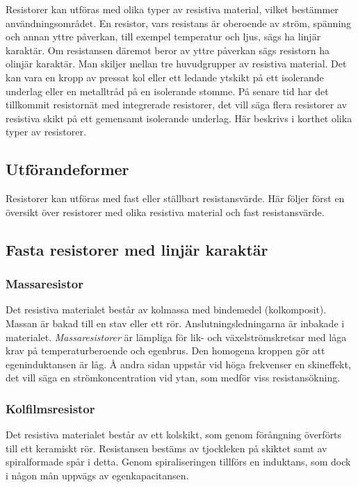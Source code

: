 Resistorer kan utföras med olika typer av resistiva material, vilket bestämmer
användningsområdet.
En resistor, vars resistans är oberoende av ström, spänning och annan yttre
påverkan, till exempel temperatur och ljus, sägs ha linjär karaktär.
Om resistansen däremot beror av yttre påverkan sägs resistorn ha olinjär
karaktär.
Man skiljer mellan tre huvudgrupper av resistiva material.
Det kan vara en kropp av pressat kol eller ett ledande ytskikt på ett isolerande
underlag eller en metalltråd på en isolerande stomme.
På senare tid har det tillkommit resistornät med integrerade resistorer, det
vill säga flera resistorer av resistiva skikt på ett gemensamt isolerande
underlag.
Här beskrivs i korthet olika typer av resistorer.

\subsection{Utförandeformer}

Resistorer kan utföras med fast eller ställbart resistansvärde.
Här följer först en översikt över resistorer med olika resistiva material och
fast resistansvärde.

\subsection{Fasta resistorer med linjär karaktär}
\label{fasta_resistorer_linjära}

\subsubsection{Massaresistor}

Det resistiva materialet består av kolmassa med bindemedel (kolkomposit).
Massan är bakad till en stav eller ett rör.
Anslutningsledningarna är inbakade i materialet.
\emph{Massaresistorer} är lämpliga för lik- och växelströmskretsar med
låga krav på temperaturberoende och egenbrus.
Den homogena kroppen gör att egeninduktansen är låg.
Å andra sidan uppstår vid höga frekvenser en skineffekt, det vill säga en
strömkoncentration vid ytan, som medför viss resistansökning.

\subsubsection{Kolfilmsresistor}

Det resistiva materialet består av ett kolskikt, som genom förångning överförts
till ett keramiskt rör.
Resistansen bestäms av tjockleken på skiktet samt av spiralformade spår i
detta.
Genom spiraliseringen tillförs en induktans, som dock i någon mån uppvägs av
egenkapacitansen.


